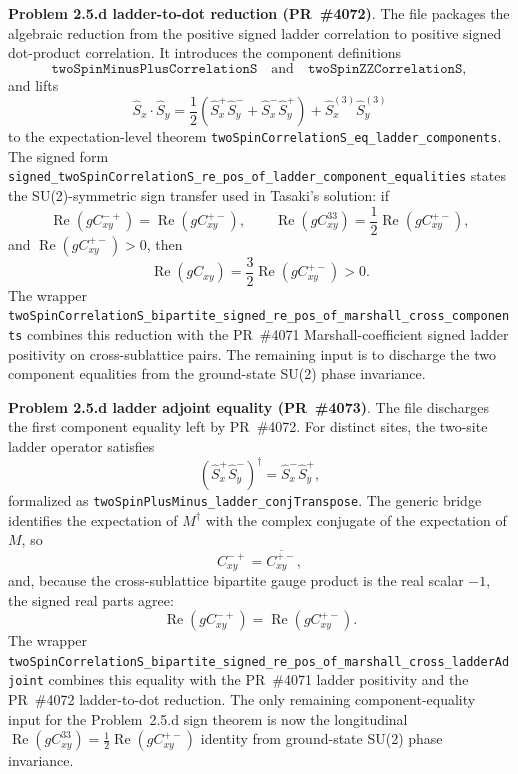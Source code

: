 \documentclass[a4paper,11pt]{article}
\begin{document}
\textbf{Problem 2.5.d ladder-to-dot reduction (PR~\#4072)}.
The file 
packages the algebraic reduction from the positive signed ladder correlation
to positive signed dot-product correlation.  It introduces the component
definitions
\[
  \texttt{twoSpinMinusPlusCorrelationS}
  \quad\text{and}\quad
  \texttt{twoSpinZZCorrelationS},
\]
and lifts
\[
  \hat S_x\cdot\hat S_y
  =
  \frac12(\hat S_x^+\hat S_y^-+\hat S_x^-\hat S_y^+)
  + \hat S_x^{(3)}\hat S_y^{(3)}
\]
to the expectation-level theorem
\texttt{twoSpinCorrelationS\_eq\_ladder\_components}.  The signed form
\texttt{signed\_twoSpinCorrelationS\_re\_pos\_of\_ladder\_component\_equalities}
states the SU(2)-symmetric sign transfer used in Tasaki's solution: if
\[
  \operatorname{Re}(g C^{-+}_{xy})=\operatorname{Re}(g C^{+-}_{xy}),
  \qquad
  \operatorname{Re}(g C^{33}_{xy})
    =\frac12\operatorname{Re}(g C^{+-}_{xy}),
\]
and \(\operatorname{Re}(g C^{+-}_{xy})>0\), then
\[
  \operatorname{Re}(g C_{xy})
  =
  \frac32\operatorname{Re}(g C^{+-}_{xy})>0.
\]
The wrapper
\texttt{twoSpinCorrelationS\_bipartite\_signed\_re\_pos\_of\_marshall\_cross\_components}
combines this reduction with the PR~\#4071 Marshall-coefficient signed ladder
positivity on cross-sublattice pairs.  The remaining input is to discharge the
two component equalities from the ground-state SU(2) phase invariance.

\textbf{Problem 2.5.d ladder adjoint equality (PR~\#4073)}.
The file 
discharges the first component equality left by PR~\#4072.  For distinct
sites, the two-site ladder operator satisfies
\[
  (\hat S_x^+\hat S_y^-)^\dagger=\hat S_x^-\hat S_y^+,
\]
formalized as \texttt{twoSpinPlusMinus\_ladder\_conjTranspose}.  The generic
bridge  identifies
the expectation of \(M^\dagger\) with the complex conjugate of the expectation
of \(M\), so
\[
  C^{-+}_{xy}=\overline{C^{+-}_{xy}},
\]
and, because the cross-sublattice bipartite gauge product is the real scalar
\(-1\), the signed real parts agree:
\[
  \operatorname{Re}(g C^{-+}_{xy})
  =\operatorname{Re}(g C^{+-}_{xy}).
\]
The wrapper
\texttt{twoSpinCorrelationS\_bipartite\_signed\_re\_pos\_of\_marshall\_cross\_ladderAdjoint}
combines this equality with the PR~\#4071 ladder positivity and the PR~\#4072
ladder-to-dot reduction.  The only remaining component-equality input for the
Problem~2.5.d sign theorem is now the longitudinal
\(\operatorname{Re}(gC^{33}_{xy})=\frac12\operatorname{Re}(gC^{+-}_{xy})\)
identity from ground-state SU(2) phase invariance.
\end{document}
